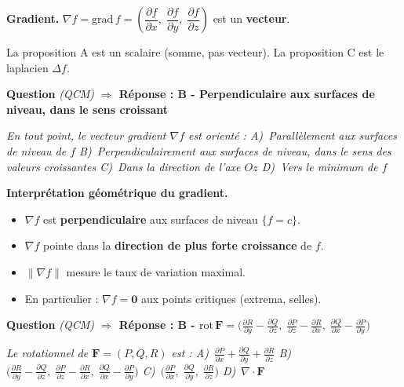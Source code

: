 \documentclass[11pt,a4paper]{article}
\newcounter{qnum}
\newcommand{\qtitre}[2]{%
  \stepcounter{qnum}%
  \medskip\noindent
  \textbf{\color{bleutexte}Question \theqnum}\enspace
  \textit{(#1)}\enspace
  \textcolor{vertok}{\textbf{$\Rightarrow$ Réponse : #2}}
  \par\smallskip
}
\newcommand{\qenonce}[1]{%
  \begin{mdframed}[backgroundcolor=grisbox, linewidth=0pt,
    innerleftmargin=8pt, innerrightmargin=8pt,
    innertopmargin=5pt, innerbottommargin=5pt,
    skipabove=2pt, skipbelow=4pt]
  \small\textit{#1}
  \end{mdframed}
}
\begin{document}
\begin{methodebox}
\textbf{Gradient.} $\nabla f = \mathrm{grad}\,f = \left(\dfrac{\partial f}{\partial x},\;\dfrac{\partial f}{\partial y},\;\dfrac{\partial f}{\partial z}\right)$ est un \textbf{vecteur}.

La proposition A est un scalaire (somme, pas vecteur). La proposition C est le laplacien $\Delta f$.
\end{methodebox}

\qtitre{QCM}{B - Perpendiculaire aux surfaces de niveau, dans le sens croissant}
\qenonce{En tout point, le vecteur gradient $\nabla f$ est orienté :
\quad A)~Parallèlement aux surfaces de niveau de $f$
\quad B)~Perpendiculairement aux surfaces de niveau, dans le sens des valeurs croissantes
\quad C)~Dans la direction de l'axe $Oz$
\quad D)~Vers le minimum de $f$}

\begin{methodebox}
\textbf{Interprétation géométrique du gradient.}
\begin{itemize}[itemsep=1pt, topsep=2pt]
  \item $\nabla f$ est \textbf{perpendiculaire} aux surfaces de niveau $\{f = c\}$.
  \item $\nabla f$ pointe dans la \textbf{direction de plus forte croissance} de $f$.
  \item $\|\nabla f\|$ mesure le taux de variation maximal.
  \item En particulier : $\nabla f = \mathbf{0}$ aux points critiques (extrema, selles).
\end{itemize}
\end{methodebox}

\qtitre{QCM}{B - $\text{rot}\,\mathbf{F} = \bigl(\frac{\partial R}{\partial y}-\frac{\partial Q}{\partial z},\;\frac{\partial P}{\partial z}-\frac{\partial R}{\partial x},\;\frac{\partial Q}{\partial x}-\frac{\partial P}{\partial y}\bigr)$}
\qenonce{Le rotationnel de $\mathbf{F}=(P,Q,R)$ est :
\quad A)~$\frac{\partial P}{\partial x}+\frac{\partial Q}{\partial y}+\frac{\partial R}{\partial z}$
\quad B)~$\bigl(\frac{\partial R}{\partial y}-\frac{\partial Q}{\partial z},\;\frac{\partial P}{\partial z}-\frac{\partial R}{\partial x},\;\frac{\partial Q}{\partial x}-\frac{\partial P}{\partial y}\bigr)$
\quad C)~$\bigl(\frac{\partial P}{\partial x},\;\frac{\partial Q}{\partial y},\;\frac{\partial R}{\partial z}\bigr)$
\quad D)~$\nabla\cdot\mathbf{F}$}
\end{document}
